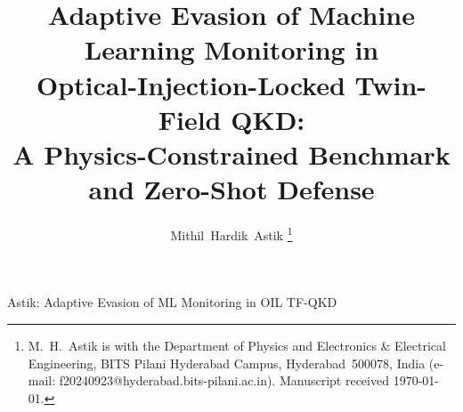 \documentclass[journal,twocolumn]{IEEEtran}
\begin{document}
\title{Adaptive Evasion of Machine Learning Monitoring in\\
       Optical-Injection-Locked Twin-Field QKD:\\
       A Physics-Constrained Benchmark and Zero-Shot Defense}

\author{%
  Mithil~Hardik~Astik%
  \thanks{M.~H.~Astik is with the Department of Physics and Electronics \&
          Electrical Engineering, BITS Pilani Hyderabad Campus, Hyderabad~500078,
          India (e-mail: f20240923@hyderabad.bits-pilani.ac.in). Manuscript received
          \today.}%
}

%
         {Astik: Adaptive Evasion of ML Monitoring in OIL TF-QKD}

\maketitle
\end{document}
